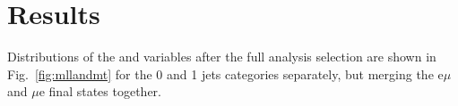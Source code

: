 \section{Results}\label{chap5:results}

Distributions of the \mll and \mt variables after the full analysis selection are shown in Fig.~\ref{fig:mllandmt} for the 0 and 1 jets categories separately, but merging the e$\mu$ and $\mu$e final states together.

\begin{figure}
\centering
{}
\\
\end{figure}
